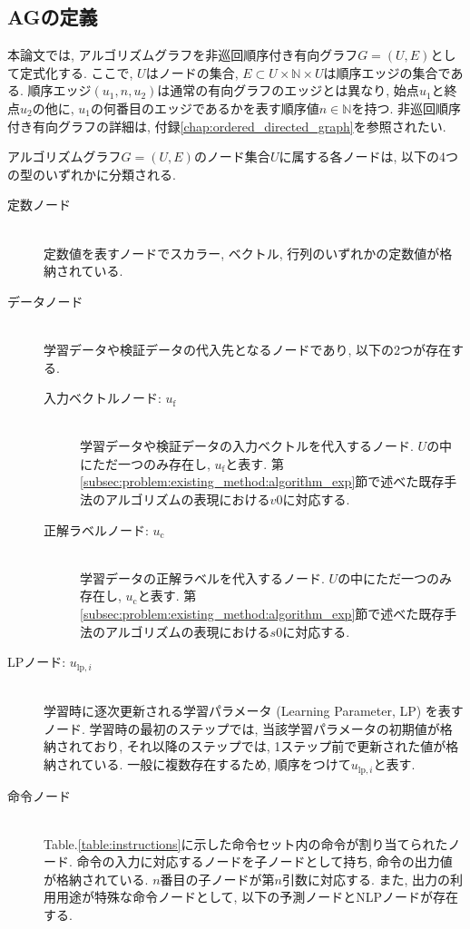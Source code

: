 \documentclass[11pt,oneside,openany,report]{jsbook}
\begin{document}
\subsection{AGの定義}\label{subsec:proposed:ag:exp}
本論文では, アルゴリズムグラフを非巡回順序付き有向グラフ$G = (U, E)$として定式化する. ここで, $U$はノードの集合, $E \subset U \times \mathbb{N} \times U$は順序エッジの集合である. 順序エッジ$(u_1, n, u_2)$は通常の有向グラフのエッジとは異なり, 始点$u_1$と終点$u_2$の他に, $u_1$の何番目のエッジであるかを表す順序値$n \in \mathbb{N}$を持つ. 非巡回順序付き有向グラフの詳細は, 付録\ref{chap:ordered_directed_graph}を参照されたい.

アルゴリズムグラフ$G = (U, E)$のノード集合$U$に属する各ノードは, 以下の4つの型のいずれかに分類される.

\begin{description}
  \item[定数ノード] \ \\ 定数値を表すノードでスカラー, ベクトル, 行列のいずれかの定数値が格納されている.
  \item[データノード]\ \\ 学習データや検証データの代入先となるノードであり, 以下の2つが存在する.
  \begin{description}
    \item[入力ベクトルノード: $u_\mathrm{f}$] \ \\ 学習データや検証データの入力ベクトルを代入するノード. $U$の中にただ一つのみ存在し, $u_\mathrm{f}$と表す. 第\ref{subsec:problem:existing_method:algorithm_exp}節で述べた既存手法のアルゴリズムの表現における$v0$に対応する.
    \item[正解ラベルノード: $u_\mathrm{c}$] \ \\ 学習データの正解ラベルを代入するノード. $U$の中にただ一つのみ存在し, $u_\mathrm{c}$と表す. 第\ref{subsec:problem:existing_method:algorithm_exp}節で述べた既存手法のアルゴリズムの表現における$s0$に対応する.
  \end{description}
  \item[LPノード: $u_{\mathrm{lp},i}$] \ \\ 学習時に逐次更新される学習パラメータ (Learning Parameter, LP) を表すノード. 学習時の最初のステップでは, 当該学習パラメータの初期値が格納されており, それ以降のステップでは, 1ステップ前で更新された値が格納されている. 一般に複数存在するため, 順序をつけて$u_{\mathrm{lp},i}$と表す.
  \item[命令ノード] \ \\ Table.\ref{table:instructions}に示した命令セット内の命令が割り当てられたノード. 命令の入力に対応するノードを子ノードとして持ち, 命令の出力値が格納されている. $n$番目の子ノードが第$n$引数に対応する. また, 出力の利用用途が特殊な命令ノードとして, 以下の予測ノードとNLPノードが存在する.

\end{description}
\end{document}
